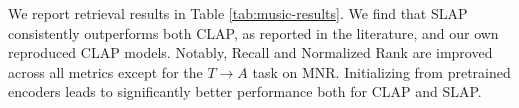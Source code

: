 \documentclass{article}
\newcommand{\redcross}{\textcolor{red}{\ding{55}}} %
\newcommand{\greencheck}{\textcolor{green}{\ding{51}}} %
\begin{document}
                           



We report retrieval results in Table \ref{tab:music-results}. We find that SLAP consistently outperforms both CLAP, as reported in the literature, and our own reproduced CLAP models. Notably, Recall and Normalized Rank are improved across all metrics except for the $T \rightarrow A$ task on MNR. Initializing from pretrained encoders leads to significantly better performance both for CLAP and SLAP.%
\end{document}
